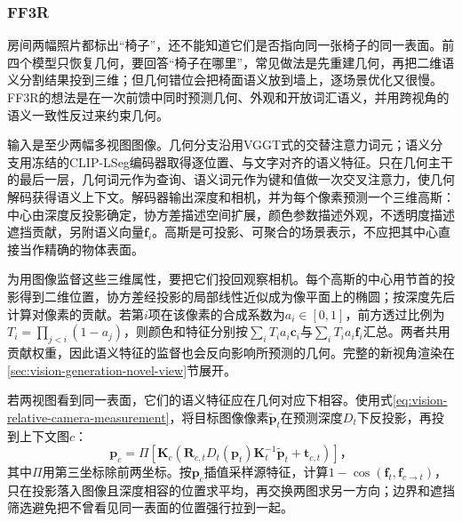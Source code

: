 \subsubsection{FF3R}
\label{sec:vision-recognition-ff3r}

房间两幅照片都标出“椅子”，还不能知道它们是否指向同一张椅子的同一表面。前四个模型只恢复几何，要回答“椅子在哪里”，常见做法是先重建几何，再把二维语义分割结果投到三维；但几何错位会把椅面语义放到墙上，逐场景优化又很慢。FF3R的想法是在一次前馈中同时预测几何、外观和开放词汇语义，并用跨视角的语义一致性反过来约束几何。

输入是至少两幅多视图图像。几何分支沿用VGGT式的交替注意力词元；语义分支用冻结的CLIP-LSeg编码器取得逐位置、与文字对齐的语义特征。只在几何主干的最后一层，几何词元作为查询、语义词元作为键和值做一次交叉注意力，使几何解码获得语义上下文。解码器输出深度和相机，并为每个像素预测一个三维高斯：中心由深度反投影确定，协方差描述空间扩展，颜色参数描述外观，不透明度描述遮挡贡献，另附语义向量$\bm{f}_i$。高斯是可投影、可聚合的场景表示，不应把其中心直接当作精确的物体表面。

为用图像监督这些三维属性，要把它们投回观察相机。每个高斯的中心用节首的投影得到二维位置，协方差经投影的局部线性近似成为像平面上的椭圆；按深度先后计算对像素的贡献。若第$i$项在该像素的合成系数为$a_i\in[0,1]$，前方透过比例为$T_i=\prod_{j<i}(1-a_j)$，则颜色和特征分别按$\sum_iT_i a_i\bm c_i$与$\sum_iT_i a_i\bm f_i$汇总。两者共用贡献权重，因此语义特征的监督也会反向影响所预测的几何。完整的新视角渲染在\ref{sec:vision-generation-novel-view}节展开。

若两视图看到同一表面，它们的语义特征应在几何对应下相容。使用式\eqref{eq:vision-relative-camera-measurement}，将目标图像像素$\tilde{\bm{p}}_t$在预测深度$D_t$下反投影，再投到上下文图$c$：
\begin{equation}
 \bm{p}_c=
 \Pi\!\left[
 \bm{K}_c\left(
 \bm{R}_{c,t}D_t(\bm{p}_t)\bm{K}_t^{-1}\tilde{\bm{p}}_t
 +\bm{t}_{c,t}\right)\right]\text{，}
 \label{eq:vision-ff3r-warp}
\end{equation}
其中$\Pi$用第三坐标除前两坐标。按$\bm{p}_c$插值采样源特征，计算$1-\cos(\bm{f}_t,\bm{f}_{c\to t})$，只在投影落入图像且深度相容的位置求平均，再交换两图求另一方向；边界和遮挡筛选避免把不曾看见同一表面的位置强行拉到一起。

